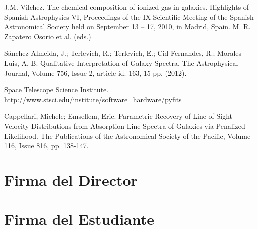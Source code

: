 \documentclass[12pt]{article}
\begin{document}
\begin{thebibliography}{10}
 J.M. Vilchez. The chemical composition of ionized gas in galaxies. Highlights of Spanish Astrophysics VI, Proceedings of the IX Scientific Meeting of the Spanish Astronomical Society held on September 13 -- 17, 2010, in Madrid, Spain. M. R. Zapatero Osorio et al. (eds.)

 S\'anchez Almeida, J.; Terlevich, R.; Terlevich, E.; Cid Fernandes, R.; Morales-Luis, A. B. Qualitative Interpretation of Galaxy Spectra. The Astrophysical Journal, Volume 756, Issue 2, article id. 163, 15 pp. (2012).

 Space Telescope Science Institute. \url{http://www.stsci.edu/institute/software_hardware/pyfits}

 Cappellari, Michele; Emsellem, Eric. Parametric Recovery of Line-of-Sight Velocity Distributions from Absorption-Line Spectra of Galaxies via Penalized Likelihood. The Publications of the Astronomical Society of the Pacific, Volume 116, Issue 816, pp. 138-147.

\end{thebibliography}

\section*{Firma del Director}
\vspace{1.5cm}

\section*{Firma del Estudiante	}
\end{document}
